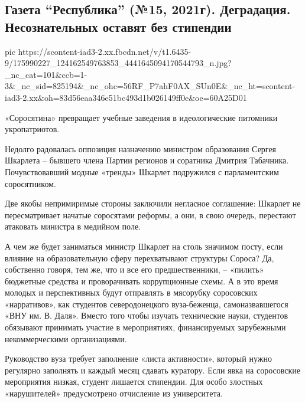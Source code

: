  
 
 
 
 
\subsection{Газета \enquote{Республика} (№15, 2021г).  Деградация.  Несознательных оставят без стипендии}
\label{sec:19_04_2021.fb.respublikalnr.2.ukr_obrazovanie_soros}

\ifcmt
  pic https://scontent-iad3-2.xx.fbcdn.net/v/t1.6435-9/175990227_124162549763853_4441645094170544793_n.jpg?_nc_cat=101&ccb=1-3&_nc_sid=825194&_nc_ohc=56RF_P7ahF0AX_SUn0E&_nc_ht=scontent-iad3-2.xx&oh=83d56eaa346e51bc493d1b026149ff0e&oe=60A25D01
\fi

«Соросятина» превращает учебные заведения в идеологические питомники укропатриотов.

Недолго радовалась оппозиция назначению министром образования Сергея Шкарлета –
бывшего члена Партии регионов и соратника Дмитрия Табачника. Почувствовавший
модные «тренды» Шкарлет подружился с парламентским соросятником.

Две якобы непримиримые стороны заключили негласное соглашение: Шкарлет не
пересматривает начатые соросятами реформы, а они, в свою очередь, перестают
атаковать министра в медийном поле. 

А чем же будет заниматься министр Шкарлет на столь значимом посту, если влияние
на образовательную сферу перехватывают структуры Сороса? Да, собственно говоря,
тем же, что и все его предшественники, – «пилить» бюджетные средства и
проворачивать коррупционные схемы. А в это время молодых и перспективных будут
отправлять в мясорубку соросовских «нарративов», как студентов северодонецкого
вуза-беженца, самоназвавшегося «ВНУ им. В. Даля». Вместо того чтобы изучать
технические науки, студентов обязывают принимать участие в мероприятиях,
финансируемых зарубежными некоммерческими организациями. 

Руководство вуза требует заполнение «листа активности», который нужно регулярно
заполнять и каждый месяц сдавать куратору. Если явка на соросовские мероприятия
низкая, студент лишается стипендии. Для особо злостных «нарушителей»
предусмотрено отчисление из университета.

